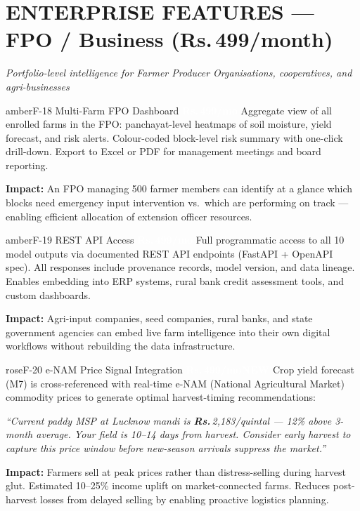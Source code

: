\documentclass[12pt,a4paper]{article}
\newcommand{\Rup}{\textbf{Rs.\,}}
\newcommand{\bizzbadge}{\textcolor{white}{\colorbox{amber}{\footnotesize\textbf{\Rup499/mo}}}}
\newcommand{\newbadge}{\textcolor{white}{\colorbox{rose}{\footnotesize\textbf{NEW}}}}
\begin{document}
\section{ENTERPRISE FEATURES --- FPO / Business (\Rup499/month)}
\textit{Portfolio-level intelligence for Farmer Producer Organisations, cooperatives, and agri-businesses}

\begin{featurebox}{amber}{F-18 \quad Multi-Farm FPO Dashboard \quad \bizzbadge}
Aggregate view of all enrolled farms in the FPO: panchayat-level heatmaps of soil moisture, yield forecast, and risk alerts. Colour-coded block-level risk summary with one-click drill-down. Export to Excel or PDF for management meetings and board reporting.

\textbf{Impact:} An FPO managing 500 farmer members can identify at a glance which blocks need emergency input intervention vs.\ which are performing on track --- enabling efficient allocation of extension officer resources.
\end{featurebox}

\begin{featurebox}{amber}{F-19 \quad REST API Access \quad \bizzbadge}
Full programmatic access to all 10 model outputs via documented REST API endpoints (FastAPI + OpenAPI spec). All responses include provenance records, model version, and data lineage. Enables embedding into ERP systems, rural bank credit assessment tools, and custom dashboards.

\textbf{Impact:} Agri-input companies, seed companies, rural banks, and state government agencies can embed live farm intelligence into their own digital workflows without rebuilding the data infrastructure.
\end{featurebox}

\begin{featurebox}{rose}{F-20 \quad e-NAM Price Signal Integration \quad \bizzbadge\quad\newbadge}
Crop yield forecast (M7) is cross-referenced with real-time e-NAM (National Agricultural Market) commodity prices to generate optimal harvest-timing recommendations:

\textit{``Current paddy MSP at Lucknow mandi is \Rup2,183/quintal --- 12\% above 3-month average. Your field is 10--14 days from harvest. Consider early harvest to capture this price window before new-season arrivals suppress the market.''}

\textbf{Impact:} Farmers sell at peak prices rather than distress-selling during harvest glut. Estimated 10--25\% income uplift on market-connected farms. Reduces post-harvest losses from delayed selling by enabling proactive logistics planning.
\end{featurebox}
\end{document}
